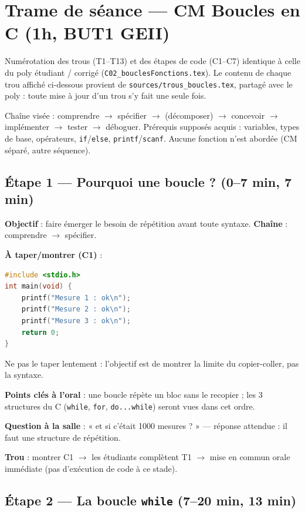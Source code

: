 \documentclass[cours, noCustomPackages]{UPSTI_Document}
\begin{document}
\section*{Trame de séance --- CM Boucles en C (1h, BUT1 GEII)}

Numérotation des trous (T1--T13) et des étapes de code (C1--C7) identique à
celle du poly étudiant / corrigé (\texttt{C02\_bouclesFonctions.tex}). Le
contenu de chaque trou affiché ci-dessous provient de
\texttt{sources/trous\_boucles.tex}, partagé avec le poly : toute mise à jour
d'un trou s'y fait une seule fois.

Chaîne visée : comprendre $\to$ spécifier $\to$ (décomposer) $\to$ concevoir
$\to$ implémenter $\to$ tester $\to$ déboguer. Prérequis supposés acquis :
variables, types de base, opérateurs, \texttt{if}/\texttt{else},
\texttt{printf}/\texttt{scanf}. Aucune fonction n'est abordée (CM séparé,
autre séquence).



\subsection*{Étape 1 --- Pourquoi une boucle ? (0--7 min, 7 min)}

\textbf{Objectif} : faire émerger le besoin de répétition avant toute
syntaxe. \textbf{Chaîne} : comprendre $\to$ spécifier.

\textbf{À taper/montrer (C1)} :
\begin{lstlisting}[language=c]
#include <stdio.h>
int main(void) {
    printf("Mesure 1 : ok\n");
    printf("Mesure 2 : ok\n");
    printf("Mesure 3 : ok\n");
    return 0;
}
\end{lstlisting}
Ne pas le taper lentement : l'objectif est de montrer la limite du
copier-coller, pas la syntaxe.

\textbf{Points clés à l'oral} : une boucle répète un bloc sans le recopier ;
les 3 structures du C (\texttt{while}, \texttt{for}, \texttt{do...while})
seront vues dans cet ordre.

\textbf{Question à la salle} : « et si c'était 1000 mesures ? » --- réponse
attendue : il faut une structure de répétition.

\textbf{Trou} : montrer C1 $\to$ les étudiants complètent T1 $\to$ mise en
commun orale immédiate (pas d'exécution de code à ce stade).

\TrouUn

\subsection*{Étape 2 --- La boucle \texttt{while} (7--20 min, 13 min)}
\end{document}
